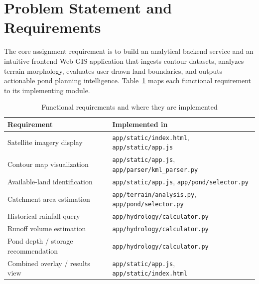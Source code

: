 \documentclass[manuscript,screen,review]{acmart}
\begin{document}
\section{Problem Statement and Requirements}
\label{sec:requirements}
The core assignment requirement is to build an analytical backend service and an intuitive frontend Web GIS application that ingests contour datasets, analyzes terrain morphology, evaluates user-drawn land boundaries, and outputs actionable pond planning intelligence. Table~\ref{tab:requirements} maps each functional requirement to its implementing module.

\begin{table}[h]
  \caption{Functional requirements and where they are implemented}
  \label{tab:requirements}
  \centering
  \small
  \begin{tabular}{p{6.5cm}p{7.5cm}}
    \toprule
    Requirement & Implemented in \\
    \midrule
    Satellite imagery display & \texttt{app/static/index.html}, \texttt{app/static/app.js} \\
    Contour map visualization & \texttt{app/static/app.js}, \texttt{app/parser/kml\_parser.py} \\
    Available-land identification & \texttt{app/static/app.js}, \texttt{app/pond/selector.py} \\
    Catchment area estimation & \texttt{app/terrain/analysis.py}, \texttt{app/pond/selector.py} \\
    Historical rainfall query & \texttt{app/hydrology/calculator.py} \\
    Runoff volume estimation & \texttt{app/hydrology/calculator.py} \\
    Pond depth / storage recommendation & \texttt{app/hydrology/calculator.py} \\
    Combined overlay / results view & \texttt{app/static/app.js}, \texttt{app/static/index.html} \\
    \bottomrule
  \end{tabular}
\end{table}
\end{document}
